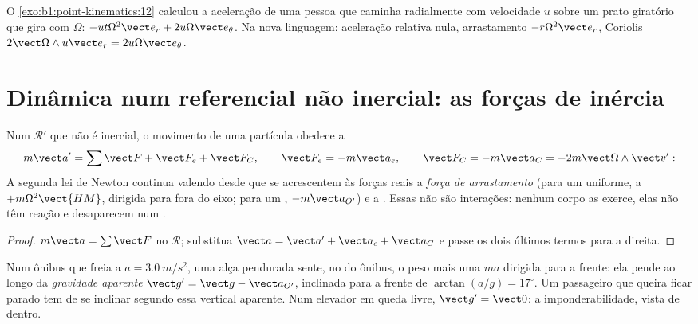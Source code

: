 \begin{example}\label{ex:b1:non-inertial-frames:turntable}
O \cref{exo:b1:point-kinematics:12} calculou a aceleração de uma pessoa que
caminha radialmente com velocidade $u$ sobre um prato giratório que gira com
 $\Omega$: $-ut\Omega^2\vect e_r
+ 2u\Omega\vect e_\theta$. Na nova linguagem: aceleração relativa nula,
arrastamento $-r\Omega^2\vect e_r$, Coriolis $2\vect\Omega\wedge u\vect e_r = 2u\Omega\vect e_\theta$.
\end{example}

\section{Dinâmica num referencial não inercial: as forças de inércia}

\begin{theorem}\label{thm:b1:non-inertial-frames:dynamics}
Num  $\mathcal R'$ que não é inercial, o movimento de uma
partícula obedece a
\[
m\vect a' = \sum\vect F + \vect F_e + \vect F_C, \qquad
\vect F_e = -m\vect a_e, \qquad \vect F_C = -m\vect a_C = -2m\vect\Omega\wedge\vect v' :
\]
A segunda lei de Newton continua valendo desde que se acrescentem às forças
reais a \emph{força de arrastamento} (para um 
uniforme, a \emph{} $+m\Omega^2\vect{HM}$, dirigida para
fora do eixo; para um , $-m\vect a_{O'}$) e a
\emph{}. Essas \emph{} não são
interações: nenhum corpo as exerce, elas não têm reação e desaparecem num
.
\end{theorem}

\begin{proof}
$m\vect a = \sum\vect F$ no  $\mathcal R$; substitua
$\vect a = \vect a' + \vect a_e + \vect a_C$ e passe os dois últimos termos
para a direita.
\end{proof}

\begin{example}\label{ex:b1:non-inertial-frames:bus}
Num ônibus que freia a $a = \qty{3.0}{m/s^2}$, uma alça pendurada sente, no
 do ônibus, o peso mais uma  $ma$ dirigida para
a frente: ela pende ao longo da \emph{gravidade aparente}
$\vect g' = \vect g - \vect a_{O'}$, inclinada para a frente de
$\arctan(a/g) = 17^\circ$. Um passageiro que queira ficar parado tem de se
inclinar segundo essa vertical aparente. Num elevador em queda livre,
$\vect g' = \vect 0$: a imponderabilidade, vista de dentro.
\end{example}

